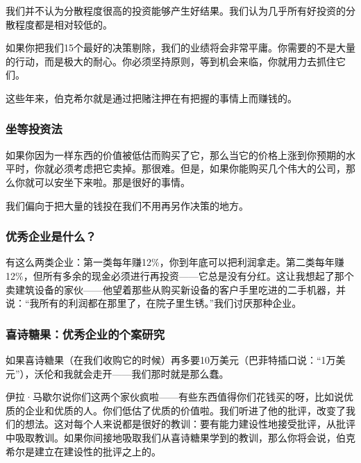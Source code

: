 我们并不认为分散程度很高的投资能够产生好结果。我们认为几乎所有好投资的分散程度都是相对较低的。
\par

如果你把我们15个最好的决策剔除，我们的业绩将会非常平庸。你需要的不是大量的行动，而是极大的耐心。你必须坚持原则，等到机会来临，你就用力去抓住它们。
\par

这些年来，伯克希尔就是通过把赌注押在有把握的事情上而赚钱的。
\par

\subsubsection*{坐等投资法}

如果你因为一样东西的价值被低估而购买了它，那么当它的价格上涨到你预期的水平时，你就必须考虑把它卖掉。那很难。但是，如果你能购买几个伟大的公司，那么你就可以安坐下来啦。那是很好的事情。
\par

我们偏向于把大量的钱投在我们不用再另作决策的地方。
\par

\subsubsection*{优秀企业是什么？}

有这么两类企业：第一类每年赚12\%，你到年底可以把利润拿走。第二类每年赚12\%，但所有多余的现金必须进行再投资——它总是没有分红。这让我想起了那个卖建筑设备的家伙——他望着那些从购买新设备的客户手里吃进的二手机器，并说：“我所有的利润都在那里了，在院子里生锈。”我们讨厌那种企业。
\par

\subsubsection*{喜诗糖果：优秀企业的个案研究}

如果喜诗糖果（在我们收购它的时候）再多要10万美元（巴菲特插口说：“1万美元”），沃伦和我就会走开——我们那时就是那么蠢。
\par

伊拉·马歇尔说你们这两个家伙疯啦——有些东西值得你们花钱买的呀，比如说优质的企业和优质的人。你们低估了优质的价值啦。我们听进了他的批评，改变了我们的想法。这对每个人来说都是很好的教训：要有能力建设性地接受批评，从批评中吸取教训。如果你间接地吸取我们从喜诗糖果学到的教训，那么你将会说，伯克希尔是建立在建设性的批评之上的。
\par

